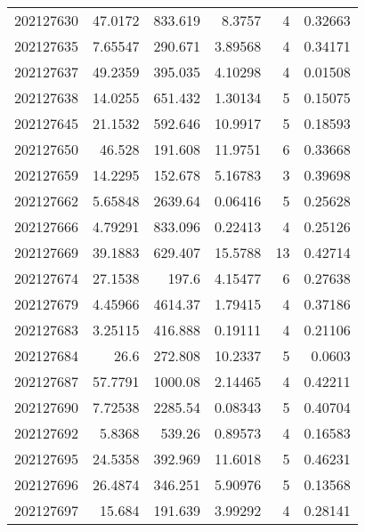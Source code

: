 \begin{tabular}{rrrrrr}
 202127630 &         47.0172  &      833.619  &            8.3757  &           4 & 0.32663 \\
 202127635 &          7.65547 &      290.671  &            3.89568 &           4 & 0.34171 \\
 202127637 &         49.2359  &      395.035  &            4.10298 &           4 & 0.01508 \\
 202127638 &         14.0255  &      651.432  &            1.30134 &           5 & 0.15075 \\
 202127645 &         21.1532  &      592.646  &           10.9917  &           5 & 0.18593 \\
 202127650 &         46.528   &      191.608  &           11.9751  &           6 & 0.33668 \\
 202127659 &         14.2295  &      152.678  &            5.16783 &           3 & 0.39698 \\
 202127662 &          5.65848 &     2639.64   &            0.06416 &           5 & 0.25628 \\
 202127666 &          4.79291 &      833.096  &            0.22413 &           4 & 0.25126 \\
 202127669 &         39.1883  &      629.407  &           15.5788  &          13 & 0.42714 \\
 202127674 &         27.1538  &      197.6    &            4.15477 &           6 & 0.27638 \\
 202127679 &          4.45966 &     4614.37   &            1.79415 &           4 & 0.37186 \\
 202127683 &          3.25115 &      416.888  &            0.19111 &           4 & 0.21106 \\
 202127684 &         26.6     &      272.808  &           10.2337  &           5 & 0.0603  \\
 202127687 &         57.7791  &     1000.08   &            2.14465 &           4 & 0.42211 \\
 202127690 &          7.72538 &     2285.54   &            0.08343 &           5 & 0.40704 \\
 202127692 &          5.8368  &      539.26   &            0.89573 &           4 & 0.16583 \\
 202127695 &         24.5358  &      392.969  &           11.6018  &           5 & 0.46231 \\
 202127696 &         26.4874  &      346.251  &            5.90976 &           5 & 0.13568 \\
 202127697 &         15.684   &      191.639  &            3.99292 &           4 & 0.28141 \\

\end{tabular}
